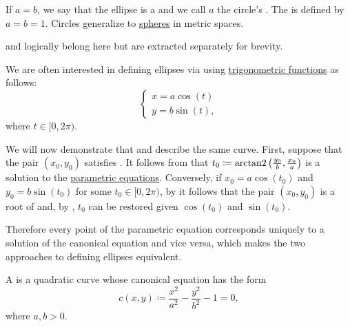 \begin{definition}
\begin{DefEnum}
    If \( a = b \), we say that the ellipse is a  and we call \( a \) the circle's . The  is defined by \( a = b = 1 \). Circles generalize to \hyperref[def:metric_space/sphere]{spheres} in metric spaces.

     and  logically belong here but are extracted separately for brevity.

    We are often interested in defining ellipses via  using \hyperref[def:trigonometric_functions]{trigonometric functions} as follows:
    \begin{equation}\label{def:quadratic_plane_curve/ellipse/parametric_equations}
      \begin{cases}
        x = a \cos(t) \\
        y = b \sin(t),
      \end{cases}
    \end{equation}
    where \( t \in [0, 2\pi) \).

    We will now demonstrate that  and  describe the same curve. First, suppose that the pair \( (x_0, y_0) \) satisfies . It follows from  that \( t_0 \coloneqq \operatorname{arctan2}\left(\tfrac {y_0} b, \tfrac {x_0} a \right) \) is a solution to the \hyperref[def:quadratic_plane_curve/ellipse/parametric_equations]{parametric equations}. Conversely, if \( x_0 = a \cos(t_0) \) and \( y_0 = b \sin(t_0) \) for some \( t_0 \in [0, 2\pi) \), by  it follows that the pair \( (x_0, y_0) \) is a root of  and, by , \( t_0 \) can be restored given \( \cos(t_0) \) and \( \sin(t_0) \).

    Therefore every point of the parametric equation  corresponds uniquely to a solution of the canonical equation  and vice versa, which makes the two approaches to defining ellipses equivalent.

     A  is a quadratic curve whose canonical equation has the form
    \begin{equation}\label{def:quadratic_plane_curve/hyperbola/canonical_equation}
      c(x, y) \coloneqq \frac {x^2} {a^2} - \frac {y^2} {b^2} - 1 = 0,
    \end{equation}
    where \( a, b > 0 \).


\end{DefEnum}
\end{definition}
